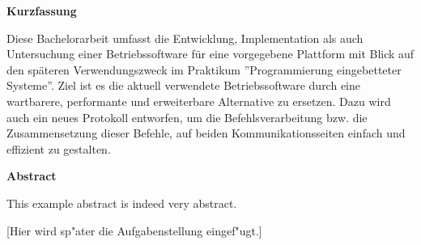 \documentclass[11pt,twoside]{scrbook}
\begin{document}

\centerline{\bf Kurzfassung}

Diese Bachelorarbeit umfasst die Entwicklung, Implementation als auch Untersuchung einer
Betriebssoftware für eine vorgegebene Plattform mit Blick auf den späteren Verwendungszweck
im Praktikum ''Programmierung eingebetteter Systeme''. Ziel ist es die aktuell verwendete
Betriebssoftware durch eine wartbarere, performante und erweiterbare Alternative zu
ersetzen. Dazu wird auch ein neues Protokoll entworfen, um die Befehlsverarbeitung bzw.
die Zusammensetzung dieser Befehle, auf beiden Kommunikationsseiten einfach und effizient
zu gestalten.

%
\vskip 3cm
%

\centerline{\bf Abstract}

This example abstract is indeed very abstract.

\cleardoublepage

\vspace*{7cm}
\centerline{[Hier wird sp"ater die Aufgabenstellung eingef"ugt.]}




\tableofcontents		%
\cleardoublepage
\listoffigures			%
\cleardoublepage
\listoftables			%
\cleardoublepage



\setcounter{page}{0}

\pagestyle{headings}


\cleardoublepage

\cleardoublepage

\cleardoublepage

\cleardoublepage
\cleardoublepage

\cleardoublepage

\cleardoublepage



\cleardoublepage

\begin{appendix}
\cleardoublepage

\end{appendix}
\end{document}
